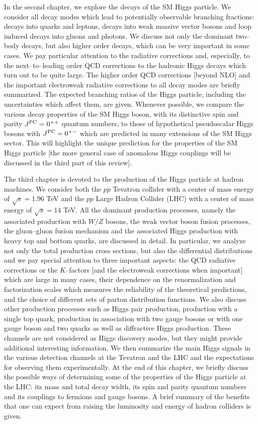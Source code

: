 In the second chapter, we explore the decays of the SM Higgs particle. We
consider all decay modes which lead to potentially observable branching 
fractions: decays into quarks and leptons, decays into weak
massive vector bosons and loop induced decays into gluons and photons. We
discuss not only the dominant two--body decays, but also higher order decays,
which can be very important in some cases. We pay particular attention to the
radiative corrections and, especially, to the next--to--leading order QCD
corrections to the hadronic Higgs decays which turn out to be quite large. 
The higher order QCD corrections [beyond NLO] and the important electroweak
radiative corrections to all decay modes are briefly summarized. The expected
branching ratios of the Higgs particle, including the uncertainties which
affect them, are given.  Whenever possible, we compare the various decay
properties of the SM Higgs boson, with its distinctive spin and parity $J^{\rm
PC}=0^{++}$ quantum numbers, to those of hypothetical pseudoscalar Higgs bosons
with $J^{\rm PC}=0^{+-}$ which are predicted in many extensions of the SM Higgs
sector. This will highlight the unique prediction for the properties of the SM
Higgs particle [the more general case of anomalous Higgs couplings will be
discussed in the third part of this review]. \s

The third chapter is devoted to the production of the Higgs particle at hadron
machines. We consider both the $p\bar p$ Tevatron collider with a center of
mass energy of $\sqrt{s}=1.96$ TeV and the $pp$ Large Hadron Collider (LHC)
with a center of mass energy of $\sqrt{s}=14$ TeV. All the dominant production
processes, namely the associated production with $W/Z$ bosons, the weak vector
boson fusion processes, the gluon--gluon fusion mechanism and the associated
Higgs production with heavy top and bottom quarks, are discussed in detail.  In
particular, we analyze not only the total production cross sections, but also
the differential distributions and we pay  special attention to three 
important aspects: the QCD radiative corrections or the $K$--factors [and the
electroweak corrections when important] which are large in many cases, their
dependence on the renormalization and factorization scales which measures the
reliability of the theoretical predictions, and the choice of different sets of
parton distribution functions. We also discuss other production processes such
as Higgs pair production, production with a single top quark, production in
association with two gauge bosons or with one gauge boson and two quarks as
well as diffractive Higgs production. These channels are not considered as
Higgs discovery modes, but they might provide additional interesting
information.  We then summarize the main Higgs signals in the various detection
channels at the Tevatron and the LHC and the expectations for observing them 
experimentally.  At the end of this chapter, we briefly discuss the possible
ways of determining some of the properties of the Higgs particle at
the LHC: its mass and total decay width, its spin and parity quantum numbers
and its couplings to fermions and gauge bosons.  A brief summary of the
benefits that one can expect from raising the luminosity and energy
of hadron colliders is given.\s 

